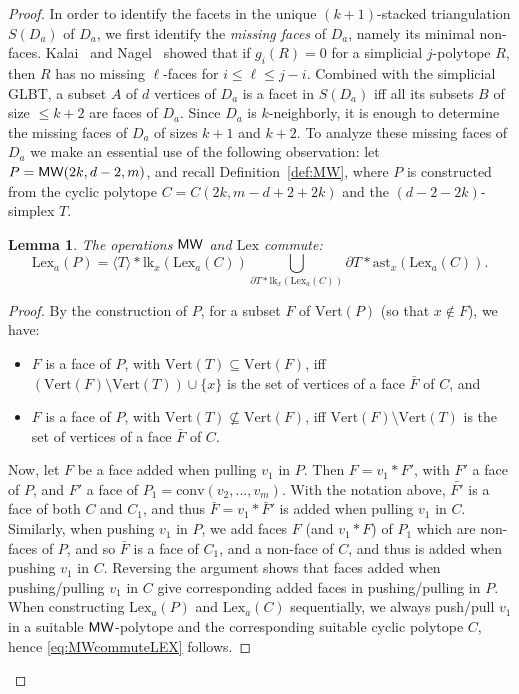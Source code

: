 \documentclass[a4paper,leqno]{article}
\newtheorem{lemma}[theorem]{Lemma}
\theoremstyle{definition}
\newcommand{\lk}{\mathrm{lk}}
\newcommand{\anst}{\mathrm{ast}}
\newcommand{\conv}{\mathrm{conv}}
\newcommand{\vertices}{\mathrm{Vert}}
\newcommand{\lex}{\mathrm{Lex}}
\newcommand{\mw}{{\sf MW}}
\begin{document}
\begin{proof}
In order to identify the facets in the unique $(k+1)$-stacked triangulation $S(D_a)$ of $D_a$, we first identify the \emph{missing faces} of $D_a$, namely its minimal non-faces.
Kalai~\cite{Kalai:missing} and Nagel~\cite{Nagel:missing} showed that if $g_i(R)=0$ for a simplicial $j$-polytope $R$, then $R$ has no missing $\ell$-faces for $i\le \ell\le j-i$.
Combined with the simplicial GLBT, a subset $A$ of $d$ vertices of $D_a$ is a facet in $S(D_a)$ iff all its subsets $B$ of size $\leq k+2$ are faces of $D_a$. Since $D_a$ is $k$-neighborly, it is enough to determine the missing faces of $D_a$ of sizes $k+1$ and $k+2$.
To analyze these missing faces of $D_a$ we make an essential use of the following observation:
let $P=\mw(2k,d-2,m)$, and recall Definition~\ref{def:MW}, where $P$ is constructed from the cyclic polytope $C=C(2k,m-d+2+2k)$ and the $(d-2-2k)$-simplex $T$.
\begin{lemma}\label{lem:MWcommuteLEX}
The operations $\mw$ and $\lex$ commute:
	\begin{equation}\label{eq:MWcommuteLEX}
	\lex_a(P)=\langle T\rangle \ast \lk_x(\lex_a(C))\bigcup_{\partial T\ast \lk_x(\lex_a(C))}\partial T\ast \anst_x(\lex_a(C)).
	\end{equation}
\end{lemma}
\begin{proof}
	 By the construction of $P$, for a subset $F$ of $\vertices(P)$ (so that $x\notin F$), we have:
	\begin{itemize}
		\item $F$ is a face of $P$, with $\vertices(T) \subseteq \vertices(F)$, iff $(\vertices(F) \setminus \vertices(T) ) \cup \{x\}$ is the set of vertices of a face $\bar{F}$ of $C$, and
		\item $F$ is a face of $P$, with $\vertices(T) \not\subseteq \vertices(F)$, iff $\vertices(F) \setminus \vertices(T)$  is the set of vertices of a face $\bar{F}$ of $C$.
	\end{itemize}
	
	Now, let $F$ be a face added when pulling $v_1$ in $P$. Then $F=v_1\ast F'$, with $F'$ a face of $P$, and $F'$ a face of $P_1=\conv(v_2,...,v_m)$.
With the notation
above, $\bar{F'}$ is a face of both $C$ and $C_1$, and thus $\bar{F}=v_1\ast \bar{F}'$ is added when pulling $v_1$ in $C$.
	Similarly, when pushing $v_1$ in $P$, we add faces $F$ (and $v_1*F$) of $P_1$ which are non-faces of $P$, and so $\bar{F}$ is a face of $C_1$, and a non-face of $C$, and thus is added when pushing $v_1$ in $C$.
	Reversing the argument shows that faces added when pushing/pulling $v_1$ in $C$ give corresponding added faces in pushing/pulling in $P$.
	When constructing $\lex_a(P)$ and $\lex_a(C)$ sequentially, we always push/pull $v_1$ in a suitable $\mw$-polytope and the corresponding suitable cyclic polytope $C$, hence \eqref{eq:MWcommuteLEX} follows.
\end{proof}


\end{proof}
\end{document}
